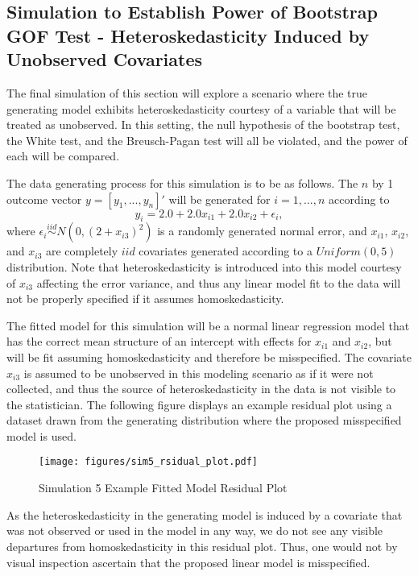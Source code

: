 		\subsection{Simulation to Establish Power of Bootstrap GOF Test - Heteroskedasticity Induced by Unobserved Covariates}

		The final simulation of this section will explore a scenario where the true generating model exhibits heteroskedasticity courtesy of a variable that will be
		treated as unobserved. In this setting, the null hypothesis of the bootstrap test, the White test, and the Breusch-Pagan test will all be violated, and the
		power of each will be compared.

		The data generating process for this simulation is to be as follows. The $n$ by 1 outcome vector $y = [y_1,...,y_n]'$ will be generated for $i = 1,...,n$ according
		to
		\begin{equation*}
			y_i = 2.0 + 2.0 x_{i1} + 2.0 x_{i2} + \epsilon_i , 
		\end{equation*}
		where $\epsilon_i \stackrel{iid}{\sim} N \left( 0,(2 + x_{i3})^2 \right)$ is a randomly generated normal error, and $x_{i1}$, $x_{i2}$, and $x_{i3}$ are completely $iid$ covariates
		generated according to a $Uniform(0,5)$ distribution. Note that heteroskedasticity is introduced into this model courtesy of $x_{i3}$ affecting the error variance, and thus any
		linear model fit to the data will not be properly specified if it assumes homoskedasticity.
		
		The fitted model for this simulation will be a normal linear regression model that has the correct mean structure of an intercept with effects for $x_{i1}$ and $x_{i2}$, but will
		be fit assuming homoskedasticity and therefore be misspecified. The covariate $x_{i3}$ is assumed to be unobserved in this modeling scenario as if it were not collected, and thus the
		source of heteroskedasticity in the data is not visible to the statistician. The following figure displays an example residual plot using a dataset drawn from the generating distribution
		where the proposed misspecified model is used.

		\begin{figure}[H]
			\centering
			\captionsetup{justification=centering}
			\texttt{[image: figures/sim5\_rsidual\_plot.pdf]}
			\caption{\label{fig:sim5_residual_plot} Simulation 5 Example Fitted Model Residual Plot}
		\end{figure}

		As the heteroskedasticity in the generating model is induced by a covariate that was not observed or used in the model in any way, we do not see any visible departures from
		homoskedasticity in this residual plot. Thus, one would not by visual inspection ascertain that the proposed linear model is misspecified. 

